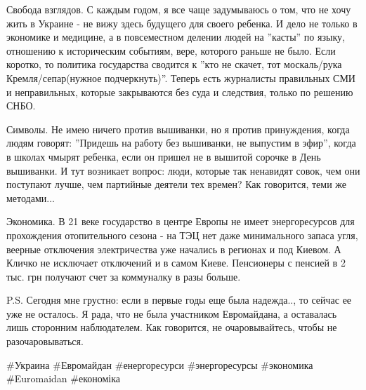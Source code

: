 Свобода взглядов. С каждым годом, я все чаще задумываюсь о том, что не хочу
жить в Украине - не вижу здесь будущего для своего ребенка. И дело не только в
экономике и медицине, а в повсеместном делении людей на ''касты'' по языку,
отношению к историческим событиям, вере, которого раньше не было. Если коротко,
то политика государства сводится к ''кто не скачет, тот москаль/рука
Кремля/сепар(нужное подчеркнуть)''. Теперь есть журналисты правильных СМИ и
неправильных, которые закрываются без суда и следствия, только по решению СНБО.

Символы. Не имею ничего против вышиванки, но я против принуждения, когда людям
говорят: ''Придешь на работу без вышиванки, не выпустим в эфир'', когда в
школах чмырят ребенка, если он пришел не в вышитой сорочке в День вышиванки. И
тут возникает вопрос: люди, которые так ненавидят совок, чем они поступают
лучше, чем партийные деятели тех времен? Как говорится, теми же методами...

Экономика. В 21 веке государство в центре Европы не имеет энергоресурсов для
прохождения отопительного сезона - на ТЭЦ нет даже минимального запаса угля,
веерные отключения электричества уже начались в регионах  и под Киевом. А
Кличко не исключает отключений и в самом Киеве. Пенсионеры с пенсией в 2 тыс.
грн получают счет за коммуналку в разы больше.

P.S. Сегодня мне грустно: если в первые годы еще была надежда.., то сейчас ее
уже не осталось. Я рада, что не была участником Евромайдана, а оставалась лишь
сторонним наблюдателем. Как говорится, не очаровывайтесь, чтобы не
разочаровываться.

\#Украина \#Евромайдан \#енергоресурси \#энергоресурсы \#экономика \#Euromaidan
\#економіка

